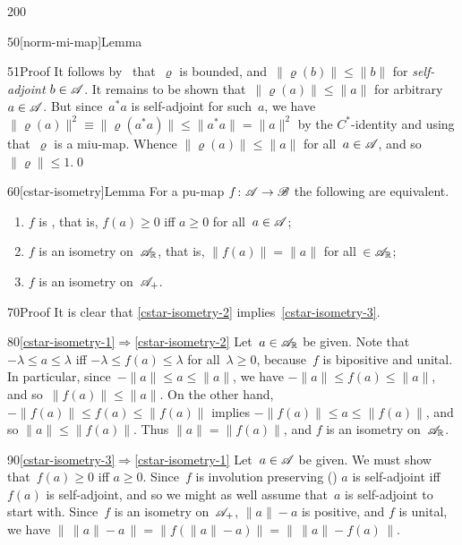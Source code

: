 \begin{parsec}{200}
\begin{point}{50}[norm-mi-map]{Lemma}
\begin{point}{51}{Proof}
It follows by~
that~$\varrho$ is bounded, and~$\|\varrho(b)\|\leq \|b\|$
for \emph{self-adjoint} $b\in \mathscr{A}$.
It remains to be shown that~$\|\varrho(a)\|\leq \|a\|$
for arbitrary~$a\in\mathscr{A}$.
But since~$a^*a$ is self-adjoint for such~$a$,
we have $\|\varrho(a)\|^2\equiv\|\varrho(a^*a)\|\leq \|a^*a\|=\|a\|^2$
by the $C^*$-identity and using that~$\varrho$
    is a miu-map. Whence $\|\varrho(a)\|\leq\|a\|$
    for all~$a\in\mathscr{A}$, and so~$\|\varrho\|\leq 1$.\qed
\end{point}
\end{point}
\begin{point}{60}[cstar-isometry]{Lemma}%
For a pu-map $f\colon \mathscr{A}\to\mathscr{B}$
the following are equivalent.
\begin{enumerate}
\item\label{cstar-isometry-1}
$f$ is %
%
, that is, $f(a)\geq 0$ iff $a\geq 0$
for all~$a\in\mathscr{A}$;
\item\label{cstar-isometry-2}%
$f$ is an isometry on~$\mathscr{A}_{\mathbb{R}}$, 
that is, $\|f(a)\|=\|a\|$ for all~$\in \mathscr{A}_{\mathbb{R}}$;
\item\label{cstar-isometry-3}
	$f$ is an isometry on~$\mathscr{A}_{+}$.
\end{enumerate}
\begin{point}{70}{Proof}%
It is clear that \ref{cstar-isometry-2} implies~\ref{cstar-isometry-3}.
\begin{point}{80}{\ref{cstar-isometry-1}$\Longrightarrow$\ref{cstar-isometry-2}}%
Let~$a\in \mathscr{A}_{\mathbb{R}}$ be given.
Note that $-\lambda \leq a\leq \lambda$
iff $-\lambda \leq f(a) \leq \lambda$
for all~$\lambda \geq 0$,
because~$f$ is bipositive and unital.
In particular,
since~$-\|a\|\leq a\leq \|a\|$,
we have $-\|a\|\leq f(a)\leq \|a\|$,
and so~$\|f(a)\|\leq \|a\|$.
On the other hand,
$-\|f(a)\|\leq f(a)\leq \|f(a)\|$
implies $-\|f(a)\|\leq a\leq \|f(a)\|$,
and so $\|a\|\leq \|f(a)\|$.
Thus $\|a\|=\|f(a)\|$,
and $f$ is an isometry on~$\mathscr{A}_{\mathbb{R}}$.
\end{point}
\begin{point}{90}{\ref{cstar-isometry-3}$\Longrightarrow$\ref{cstar-isometry-1}}%
Let~$a\in \mathscr{A}$ be given.
We must show that~$f(a)\geq 0$ iff $a\geq 0$.
Since~$f$ is involution preserving ()
$a$ is self-adjoint iff $f(a)$ is self-adjoint,
and so we might as well assume that~$a$ is self-adjoint
to start with.
Since~$f$ is an isometry on~$\mathscr{A}_+$,
$\|a\|-a$ is positive,
and $f$ is unital,
we have $\|\,\|a\|-a\,\|=\|f(\|a\|-a)\|=\|\,\|a\|-f(a)\,\|$.

\end{point}
\end{point}
\end{point}
\end{parsec}
